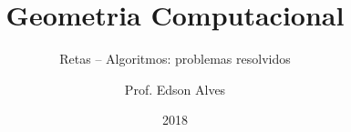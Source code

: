 \title{Geometria Computacional}
\subtitle{Retas -- Algoritmos: problemas resolvidos}
\date{2018}
\author{Prof. Edson Alves}
